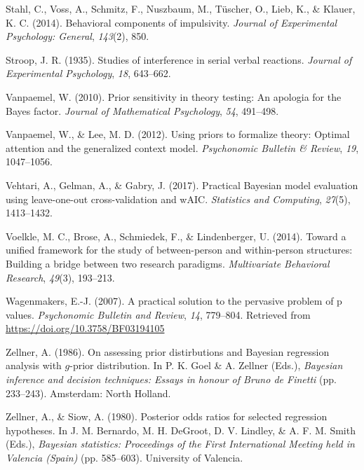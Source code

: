 \documentclass[english,man]{apa6}
\theoremstyle{definition}
\theoremstyle{definition}
\theoremstyle{remark}
\begin{document}
\hypertarget{ref-Stahl:etal:2014}{}
Stahl, C., Voss, A., Schmitz, F., Nuszbaum, M., Tüscher, O., Lieb, K.,
\& Klauer, K. C. (2014). Behavioral components of impulsivity.
\emph{Journal of Experimental Psychology: General}, \emph{143}(2), 850.

\hypertarget{ref-Stroop:1935}{}
Stroop, J. R. (1935). Studies of interference in serial verbal
reactions. \emph{Journal of Experimental Psychology}, \emph{18},
643--662.

\hypertarget{ref-Vanpaemel:2010}{}
Vanpaemel, W. (2010). Prior sensitivity in theory testing: An apologia
for the Bayes factor. \emph{Journal of Mathematical Psychology},
\emph{54}, 491--498.

\hypertarget{ref-Vanpaemel:Lee:2012}{}
Vanpaemel, W., \& Lee, M. D. (2012). Using priors to formalize theory:
Optimal attention and the generalized context model. \emph{Psychonomic
Bulletin \& Review}, \emph{19}, 1047--1056.

\hypertarget{ref-Vehtari:etal:2017}{}
Vehtari, A., Gelman, A., \& Gabry, J. (2017). Practical Bayesian model
evaluation using leave-one-out cross-validation and wAIC.
\emph{Statistics and Computing}, \emph{27}(5), 1413--1432.

\hypertarget{ref-Voelkle:etal:2014}{}
Voelkle, M. C., Brose, A., Schmiedek, F., \& Lindenberger, U. (2014).
Toward a unified framework for the study of between-person and
within-person structures: Building a bridge between two research
paradigms. \emph{Multivariate Behavioral Research}, \emph{49}(3),
193--213.

\hypertarget{ref-Wagenmakers:2007}{}
Wagenmakers, E.-J. (2007). A practical solution to the pervasive problem
of p values. \emph{Psychonomic Bulletin and Review}, \emph{14},
779--804. Retrieved from \url{https://doi.org/10.3758/BF03194105}

\hypertarget{ref-Zellner:1986}{}
Zellner, A. (1986). On assessing prior distirbutions and Bayesian
regression analysis with \(g\)-prior distribution. In P. K. Goel \& A.
Zellner (Eds.), \emph{Bayesian inference and decision techniques: Essays
in honour of Bruno de Finetti} (pp. 233--243). Amsterdam: North Holland.

\hypertarget{ref-Zellner:Siow:1980}{}
Zellner, A., \& Siow, A. (1980). Posterior odds ratios for selected
regression hypotheses. In J. M. Bernardo, M. H. DeGroot, D. V. Lindley,
\& A. F. M. Smith (Eds.), \emph{Bayesian statistics: Proceedings of the
First International Meeting held in Valencia (Spain)} (pp. 585--603).
University of Valencia.
\end{document}
